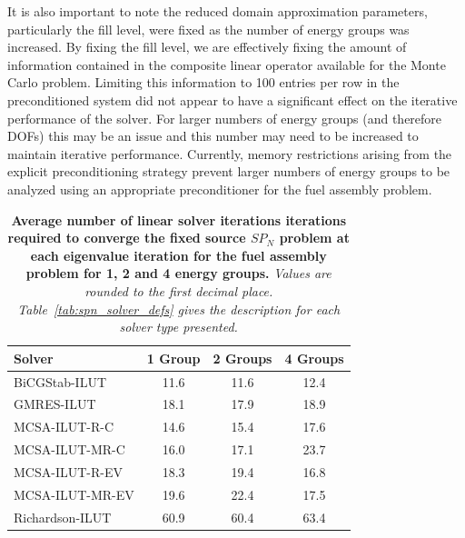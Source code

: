 It is also important to note the reduced domain approximation
parameters, particularly the fill level, were fixed as the number of
energy groups was increased. By fixing the fill level, we are
effectively fixing the amount of information contained in the
composite linear operator available for the Monte Carlo
problem. Limiting this information to 100 entries per row in the
preconditioned system did not appear to have a significant effect on
the iterative performance of the solver. For larger numbers of energy
groups (and therefore DOFs) this may be an issue and this number may
need to be increased to maintain iterative performance. Currently,
memory restrictions arising from the explicit preconditioning strategy
prevent larger numbers of energy groups to be analyzed using an
appropriate preconditioner for the fuel assembly problem.

\begin{table}[h!]
  \begin{center}
    \begin{tabular}{lccc}\hline\hline
      \multicolumn{1}{l}{Solver}&
      \multicolumn{1}{c}{1 Group}&
      \multicolumn{1}{c}{2 Groups}&
      \multicolumn{1}{c}{4 Groups}\\
      \hline
      BiCGStab-ILUT & 11.6 & 11.6 & 12.4 \\ 
      GMRES-ILUT & 18.1 & 17.9 & 18.9 \\
      MCSA-ILUT-R-C & 14.6 & 15.4 & 17.6 \\
      MCSA-ILUT-MR-C & 16.0 & 17.1 & 23.7 \\
      MCSA-ILUT-R-EV & 18.3 & 19.4 & 16.8 \\
      MCSA-ILUT-MR-EV & 19.6 & 22.4 & 17.5 \\
      Richardson-ILUT & 60.9 & 60.4 & 63.4 \\
      \hline\hline
    \end{tabular}
  \end{center}
  \caption{\textbf{Average number of linear solver iterations
      iterations required to converge the fixed source $SP_N$ problem
      at each eigenvalue iteration for the fuel assembly problem for
      1, 2 and 4 energy groups.} \textit{Values are rounded to the
      first decimal place. Table~\ref{tab:spn_solver_defs} gives the
      description for each solver type presented.}}
  \label{tab:spn_comparison_iterations}
\end{table}

